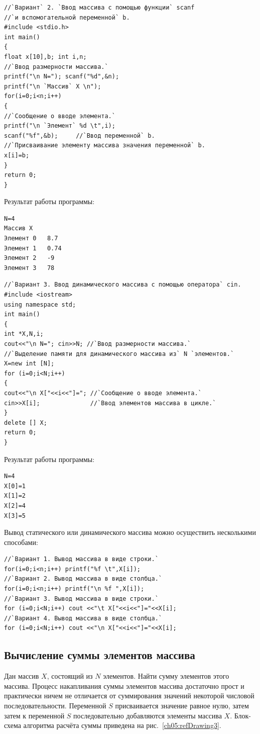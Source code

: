 \begin{lstlisting}
//`Вариант` 2. `Ввод массива с помощью функции` scanf 
//`и вспомогательной переменной` b.
#include <stdio.h>
int main()
{
float x[10],b; int i,n; 
//`Ввод размерности массива.`
printf("\n N="); scanf("%d",&n); 
printf("\n `Массив` X \n"); 
for(i=0;i<n;i++) 
{ 
//`Сообщение о вводе элемента.`
printf("\n `Элемент` %d \t",i); 
scanf("%f",&b);     //`Ввод переменной` b.
//`Присваивание элементу массива значения переменной` b.
x[i]=b; 
} 
return 0;
}
\end{lstlisting}

Результат работы программы:
\begin{verbatim}
N=4 
Массив X 
Элемент 0 	8.7 
Элемент 1 	0.74 
Элемент 2 	-9 
Элемент 3 	78 
\end{verbatim}

\begin{lstlisting}
//`Вариант 3. Ввод динамического массива с помощью оператора` cin.
#include <iostream>
using namespace std;
int main()
{
int *X,N,i;
cout<<"\n N="; cin>>N; //`Ввод размерности массива.`
//`Выделение памяти для динамического массива из` N `элементов.`
X=new int [N];
for (i=0;i<N;i++)
{
cout<<"\n X["<<i<<"]="; //`Сообщение о вводе элемента.`
cin>>X[i];              //`Ввод элементов массива в цикле.`
}
delete [] X;
return 0;
}
\end{lstlisting}

Результат работы программы:
\begin{verbatim}
N=4 
X[0]=1 
X[1]=2 
X[2]=4 
X[3]=5 
\end{verbatim}

Вывод статического или динамического массива можно осуществить несколькими способами:

\begin{lstlisting}
//`Вариант 1. Вывод массива в виде строки.`
for(i=0;i<n;i++) printf("%f \t",X[i]);
//`Вариант 2. Вывод массива в виде столбца.`
for(i=0;i<n;i++) printf("\n %f ",X[i]);
//`Вариант 3. Вывод массива в виде строки.`
for (i=0;i<N;i++) cout <<"\t X["<<i<<"]="<<X[i];
//`Вариант 4. Вывод массива в виде столбца.`
for (i=0;i<N;i++) cout <<"\n X["<<i<<"]="<<X[i];
\end{lstlisting}

\subsection[Вычисление суммы элементов массива]{Вычисление суммы элементов массива}
Дан массив $X$, состоящий из $N$ элементов. Найти сумму элементов этого массива.
Процесс накапливания суммы элементов массива достаточно прост и практически
ничем не отличается от суммирования значений некоторой числовой последовательности. Переменной $S$
присваивается значение равное нулю, затем затем к переменной $S$ последовательно добавляются элементы
 массива $X$. Блок-схема
алгоритма расчёта суммы приведена на рис.~\ref{ch05:refDrawing3}.

